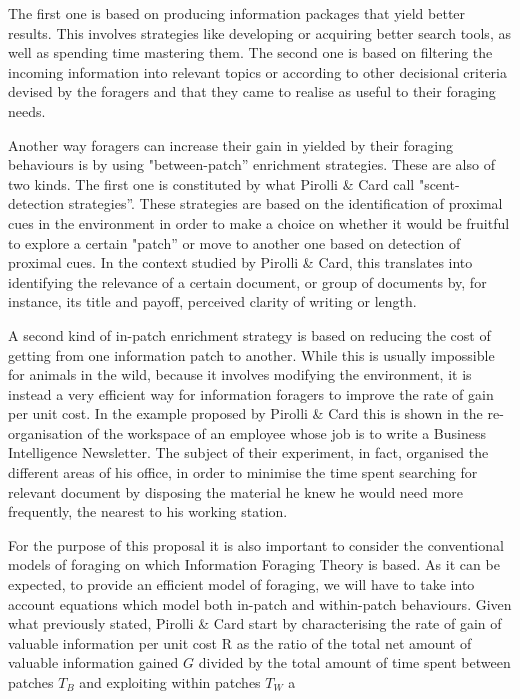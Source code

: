 \documentclass{mproj}
\begin{document}
The first one is based on producing information packages that yield better results. This involves strategies like developing or acquiring better search tools, as well as spending time mastering them. The second one is based on filtering the incoming information into relevant topics or according to other decisional criteria devised by the foragers and that they came to realise as useful to their foraging needs. 

Another way foragers can increase their gain in yielded by their foraging behaviours is by using "between-patch” enrichment strategies. These are also of two kinds. The first one is constituted by what Pirolli \& Card call "scent-detection strategies”. These strategies are based on the identification of proximal cues in the environment in order to make a choice on whether it would be fruitful to explore a certain "patch” or move to another one based on detection of proximal cues. In the context studied by Pirolli \& Card, this translates into identifying the relevance of a certain document, or group of documents by, for instance, its title and payoff, perceived clarity of writing or length. 

A second kind of in-patch enrichment strategy is based on reducing the cost of getting from one information patch to another. While this is usually impossible for animals in the wild, because it involves modifying the environment, it is instead a very efficient way for information foragers to improve the rate of gain per unit cost. In the example proposed by Pirolli \& Card this is shown in the re-organisation of the workspace of an employee whose job is to write a Business Intelligence Newsletter. The subject of their experiment, in fact, organised the different areas of his office, in order to minimise the time spent searching for relevant document by disposing the material he knew he would need more frequently, the nearest to his working station.

For the purpose of this proposal it is also important to consider the conventional models of foraging on which Information Foraging Theory is based. As it can be expected, to provide an efficient model of foraging, we will have to take into account equations which model both in-patch and within-patch behaviours. Given what previously stated, Pirolli \& Card start by characterising the rate of gain of valuable information per unit cost R as the ratio of the total net amount of valuable information gained $G$ divided by the total amount of time spent between patches $T_B$ and exploiting within patches $T_W$ a
\end{document}
